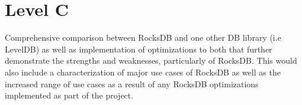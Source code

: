 \documentclass{article}
\begin{document}
\section*{Level C}

Comprehensive comparison between RocksDB and one other DB library (i.e LevelDB)
as well as implementation of optimizations to both that further demonstrate the
strengths and weaknesses, particularly of RocksDB. This would also include a
characterization of major use cases of RocksDB as well as the increased range of
use cases as a result of any RocksDB optimizations implemented as part of the
project.
\end{document}
